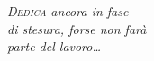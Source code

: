 \clearpage{\pagestyle{empty}\cleardoublepage}

\begin{titlepage}

\thispagestyle{empty}                   %
\topmargin=6.5cm                      %
\raggedleft                             %
\large                                  %
\em                                     %
\textsc{Dedica} ancora in fase\\
di stesura, forse non farà \\
parte del lavoro\ldots                      %
\newpage                                %
%
\clearpage{\pagestyle{empty}\cleardoublepage}%
\end{titlepage}